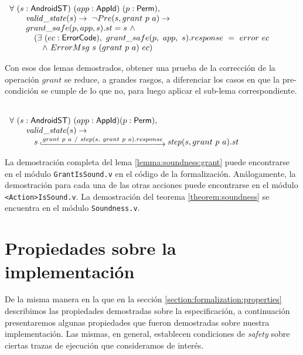 \begin{lemma}
     \mbox{} \\
    $ \begin{array}[t]{l} \forall\ (s:\AndroidState)\ (app:\AppId)\ (p:\Perm),
            \\
            \quad \quad \ap{valid\_state}{s} \rightarrow\ \neg Pre(s, grant\ p\ a) \rightarrow
            \\
            \quad \quad grant\_safe(p, app, s).st = s\ \land
            \\
            \quad \quad \quad (\exists\ (ec: \ErrorCode),\ grant\_safe(p,\ app,\ s).response\ =\
            error\ ec \\
            \quad \quad \quad \quad \land\ ErrorMsg\ s\ (grant\ p\ a)\ ec)
            \\
        \end{array} $
\end{lemma}

Con esos dos lemas demostrados, obtener una prueba de la corrección de la operación $grant$ se
reduce, a grandes rasgos, a diferenciar los casos en que la pre-condición se cumple de lo que no,
para luego aplicar el sub-lema correspondiente.

\begin{lemma}
     \label{lemma:soundness:grant} \mbox{} \\
    $ \begin{array}[t]{l} \forall\ (s:\AndroidState)\ (app:\AppId) (p:\Perm),
            \\
            \quad \quad \ap{valid\_state}{s} \rightarrow\
            \\
            \quad \quad \quad s\step{grant\ p\ a\ /\ step(s,\ grant\ p\ a).response}
            \bap{step}{s}{grant\ p\ a}.st \\
        \end{array} $
\end{lemma}

La demostración completa del lema \ref{lemma:soundness:grant} puede encontrarse en el módulo
\texttt{GrantIsSound.v} en el código de la formalización\cite{github-code}. Análogamente, la
demostración para cada una de las otras acciones puede encontrarse en el módulo
\texttt{<Action>IsSound.v}. La demostración del teorema \ref{theorem:soundness} se encuentra en el
módulo \texttt{Soundness.v}.

\section{Propiedades sobre la implementación}
De la misma manera en la que en la sección \ref{section:formalization:properties} describimos las
propiedades demostradas sobre la especificación, a continuación presentaremos algunas propiedades
que fueron demostradas sobre nuestra implementación. Las mismas, en general, establecen condiciones
de \textit{safety} sobre ciertas trazas de ejecución que consideramos de interés.

